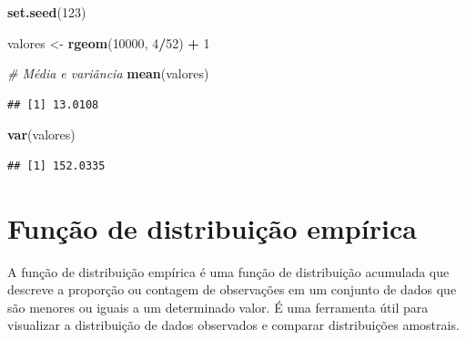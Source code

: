 \documentclass[
]{book}
\newenvironment{Shaded}{\begin{snugshade}}{\end{snugshade}}
\newcommand{\CommentTok}[1]{\textcolor[rgb]{0.56,0.35,0.01}{\textit{#1}}}
\newcommand{\DecValTok}[1]{\textcolor[rgb]{0.00,0.00,0.81}{#1}}
\newcommand{\FunctionTok}[1]{\textcolor[rgb]{0.13,0.29,0.53}{\textbf{#1}}}
\newcommand{\NormalTok}[1]{#1}
\newcommand{\OtherTok}[1]{\textcolor[rgb]{0.56,0.35,0.01}{#1}}
\newcommand{\SpecialCharTok}[1]{\textcolor[rgb]{0.81,0.36,0.00}{\textbf{#1}}}
\begin{document}
\begin{Shaded}
\begin{Highlighting}[]
\FunctionTok{set.seed}\NormalTok{(}\DecValTok{123}\NormalTok{)}

\NormalTok{valores }\OtherTok{\textless{}{-}} \FunctionTok{rgeom}\NormalTok{(}\DecValTok{10000}\NormalTok{, }\DecValTok{4}\SpecialCharTok{/}\DecValTok{52}\NormalTok{) }\SpecialCharTok{+} \DecValTok{1}

\CommentTok{\# Média e variância}
\FunctionTok{mean}\NormalTok{(valores)}
\end{Highlighting}
\end{Shaded}

\begin{verbatim}
## [1] 13.0108
\end{verbatim}

\begin{Shaded}
\begin{Highlighting}[]
\FunctionTok{var}\NormalTok{(valores)}
\end{Highlighting}
\end{Shaded}

\begin{verbatim}
## [1] 152.0335
\end{verbatim}

\section{Função de distribuição empírica}\label{funuxe7uxe3o-de-distribuiuxe7uxe3o-empuxedrica-4}

A função de distribuição empírica é uma função de distribuição acumulada
que descreve a proporção ou contagem de observações em um conjunto de
dados que são menores ou iguais a um determinado valor. É uma ferramenta
útil para visualizar a distribuição de dados observados e comparar
distribuições amostrais.
\end{document}
